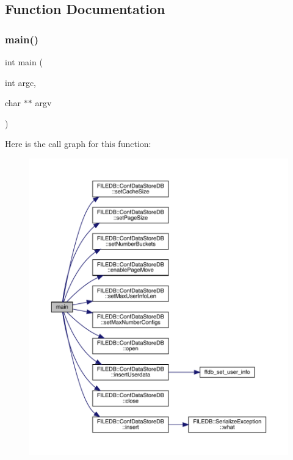 \subsection{Function Documentation}
\mbox{\label{adat-devel_2other__libs_2filedb_2src_2SConfCreateTest_8cpp_a3c04138a5bfe5d72780bb7e82a18e627}} 
\subsubsection{\texorpdfstring{main()}{main()}}
{\footnotesize\ttfamily int main (\begin{DoxyParamCaption}\item[{int}]{argc,  }\item[{char $\ast$$\ast$}]{argv }\end{DoxyParamCaption})}

Here is the call graph for this function\+:
\nopagebreak
\begin{figure}[H]
\begin{center}
\leavevmode
\includegraphics[width=350pt]{db/db2/adat-devel_2other__libs_2filedb_2src_2SConfCreateTest_8cpp_a3c04138a5bfe5d72780bb7e82a18e627_cgraph}
\end{center}
\end{figure}
